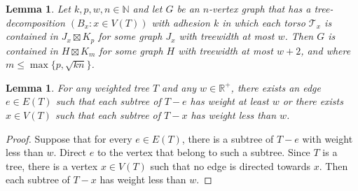 \documentclass[12pt]{article}
\renewcommand{\leq}{\leqslant}
\newcommand{\RR}{\mathbb{R}}
\newcommand{\NN}{\mathbb{N}}
\theoremstyle{plain}
\newtheorem{lem}[thm]{Lemma}
\theoremstyle{definition}
\begin{document}
\begin{lem}\label{CliqueSums}
   Let $k,p,w,n\in \NN$ and let $G$ be an $n$-vertex graph that has a tree-decomposition $(B_x:x \in V(T))$ with adhesion $k$ in which each torso $\mathcal{T}_x$ is contained in $J_x\boxtimes K_p$ for some graph $J_x$ with treewidth at most $w$. Then $G$ is contained in $H\boxtimes K_m$ for some graph $H$ with treewidth at most $w+2$, and where $m\leq\max\{p,\sqrt{kn}\}$.
\end{lem}


\begin{lem}\label{WeightedTree}
For any weighted tree $T$ and any $w\in \RR^+$, there exists an edge $e\in E(T)$ such that each subtree of $T-e$ has weight at least $w$ or there exists $x\in V(T)$ such that each subtree of $T-x$ has weight less than $w$.
\end{lem}


\begin{proof}
    Suppose that for every $e\in E(T)$, there is a subtree of $T-e$ with weight less than $w$. Direct $e$ to the vertex that belong to such a subtree. Since $T$ is a tree, there is a vertex $x\in V(T)$ such that no edge is directed towards $x$. Then each subtree of $T-x$ has weight less than $w$.
\end{proof}
\end{document}
